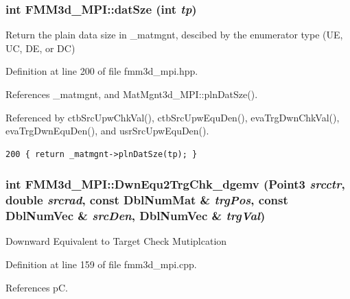 \subsubsection{\setlength{\rightskip}{0pt plus 5cm}int FMM3d\_\-MPI::dat\-Sze (int {\em tp})\hspace{0.3cm}{\tt  [inline, protected]}}\label{classFMM3d__MPI_e698f5e6e784c12d19a62b0d40456fc6_e698f5e6e784c12d19a62b0d40456fc6}


Return the plain data size in \_\-matmgnt, descibed by the enumerator type (UE, UC, DE, or DC) 

Definition at line 200 of file fmm3d\_\-mpi.hpp.

References \_\-matmgnt, and Mat\-Mgnt3d\_\-MPI::pln\-Dat\-Sze().

Referenced by ctb\-Src\-Upw\-Chk\-Val(), ctb\-Src\-Upw\-Equ\-Den(), eva\-Trg\-Dwn\-Chk\-Val(), eva\-Trg\-Dwn\-Equ\-Den(), and usr\-Src\-Upw\-Equ\-Den().

\footnotesize\begin{verbatim}200 { return _matmgnt->plnDatSze(tp); }
\end{verbatim}\normalsize 


\subsubsection{\setlength{\rightskip}{0pt plus 5cm}int FMM3d\_\-MPI::Dwn\-Equ2Trg\-Chk\_\-dgemv (Point3 {\em srcctr}, double {\em srcrad}, const Dbl\-Num\-Mat \& {\em trg\-Pos}, const Dbl\-Num\-Vec \& {\em src\-Den}, Dbl\-Num\-Vec \& {\em trg\-Val})\hspace{0.3cm}{\tt  [protected]}}\label{classFMM3d__MPI_6fa778d931d0fb3ee427bf8721f28a82_6fa778d931d0fb3ee427bf8721f28a82}


Downward Equivalent to Target Check Mutiplcation 

Definition at line 159 of file fmm3d\_\-mpi.cpp.

References p\-C.

